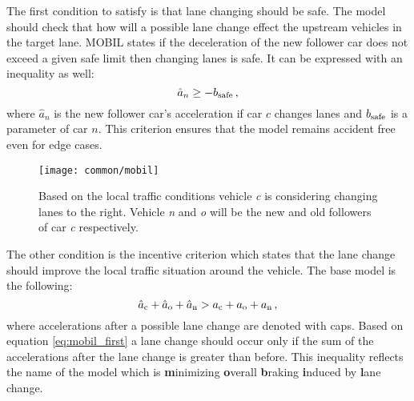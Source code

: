 		The first condition to satisfy is that lane changing should be safe. The model should check that how will a possible lane change effect the upstream vehicles in the target lane. MOBIL \cite{arne2} states if the deceleration of the new follower car does not exceed a given safe limit then changing lanes is safe. It can be expressed with an inequality as well:
		\begin{equation}
			\hat{a}_{n}\geq -b_{\rm safe}\,,
		\end{equation}
		where $\hat{a}_{n}$ is the new follower car's acceleration if car $c$ changes lanes and $b_{\rm safe}$ is a parameter of car $n$. This criterion ensures that the model remains accident free even for edge cases.
			\begin{figure}
				\centering
				\texttt{[image: common/mobil]}
				\caption{Based on the local traffic conditions vehicle \textit{c} is considering changing lanes  to the right. Vehicle \textit{n} and \textit{o} will be the new and old followers of car \textit{c} respectively.}
				\label{fig:mobil}
			\end{figure}
			The other condition is the incentive criterion which states that the lane change should improve the local traffic situation around the vehicle.  The base model is the following:
			\begin{equation}
				\hat{a}_{\rm c} + \hat{a}_{\rm o} + \hat{a}_{\rm n} > a_{\rm c} + a_{\rm o} + a_{\rm n}\,,
				\label{eq:mobil_first}
			\end{equation}
			where accelerations after a possible lane change are denoted with caps.
			Based on equation \ref{eq:mobil_first} a lane change should occur only if the sum of the accelerations after the lane change is greater than before. This inequality reflects the name of the model which is \textbf{m}inimizing \textbf{o}verall \textbf{b}raking \textbf{i}nduced by \textbf{l}ane change.

